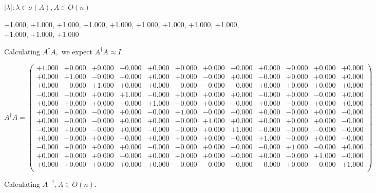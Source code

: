\documentclass[9pt]{article}
\theoremstyle{plain}
\theoremstyle{definition}
\theoremstyle{remark}
\numberwithin{equation}{section}
\begin{document}
 $|\lambda | : \lambda \in \sigma(A) , A \in O(n)$

+1.000, +1.000, +1.000, +1.000, +1.000, +1.000, +1.000, +1.000, +1.000, +1.000, +1.000, +1.000


Calculating $A^{\dag} A,$  we expect $A^{\dag} A \approx I$

$A^{\dag} A = \left(
\begin{array}{
cccccccccccc}
+1.000 & +0.000 & +0.000 & -0.000 & +0.000 & +0.000 & +0.000 & -0.000 & +0.000 & -0.000 & +0.000 & +0.000 \\
+0.000 & +1.000 & -0.000 & -0.000 & +0.000 & +0.000 & -0.000 & +0.000 & -0.000 & +0.000 & +0.000 & +0.000 \\
+0.000 & -0.000 & +1.000 & +0.000 & +0.000 & -0.000 & -0.000 & -0.000 & +0.000 & +0.000 & +0.000 & +0.000 \\
-0.000 & -0.000 & +0.000 & +1.000 & -0.000 & +0.000 & +0.000 & +0.000 & -0.000 & +0.000 & -0.000 & +0.000 \\
+0.000 & +0.000 & +0.000 & -0.000 & +1.000 & -0.000 & +0.000 & -0.000 & +0.000 & -0.000 & +0.000 & +0.000 \\
+0.000 & +0.000 & -0.000 & +0.000 & -0.000 & +1.000 & -0.000 & -0.000 & +0.000 & -0.000 & +0.000 & -0.000 \\
+0.000 & -0.000 & -0.000 & +0.000 & +0.000 & -0.000 & +1.000 & +0.000 & +0.000 & +0.000 & +0.000 & -0.000 \\
-0.000 & +0.000 & -0.000 & +0.000 & -0.000 & -0.000 & +0.000 & +1.000 & -0.000 & -0.000 & -0.000 & -0.000 \\
+0.000 & -0.000 & +0.000 & -0.000 & +0.000 & +0.000 & +0.000 & -0.000 & +1.000 & -0.000 & +0.000 & -0.000 \\
-0.000 & +0.000 & +0.000 & +0.000 & -0.000 & -0.000 & +0.000 & -0.000 & -0.000 & +1.000 & -0.000 & +0.000 \\
+0.000 & +0.000 & +0.000 & -0.000 & +0.000 & +0.000 & +0.000 & -0.000 & +0.000 & -0.000 & +1.000 & -0.000 \\
+0.000 & +0.000 & +0.000 & +0.000 & +0.000 & -0.000 & -0.000 & -0.000 & -0.000 & +0.000 & -0.000 & +1.000 \\
\end{array}
\right)$ \newline 

Calculating $A^{-1} ,  A \in O(n)$.
\end{document}
